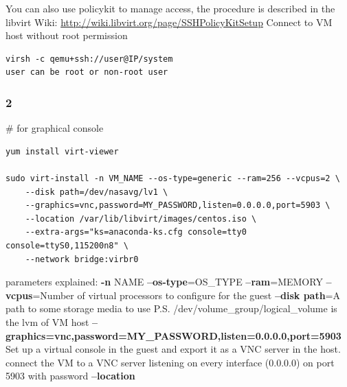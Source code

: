 \documentclass{article}
\begin{document}
You can also use policykit to manage access, the procedure is described in the libvirt Wiki: \url{http://wiki.libvirt.org/page/SSHPolicyKitSetup}
\newline
Connect to VM host without root permission
\begin{verbatim}
virsh -c qemu+ssh://user@IP/system
user can be root or non-root user
\end{verbatim}



    \subsubsection{2}

\# for graphical console\newline

\begin{verbatim}
yum install virt-viewer

sudo virt-install -n VM_NAME --os-type=generic --ram=256 --vcpus=2 \
    --disk path=/dev/nasavg/lv1 \
    --graphics=vnc,password=MY_PASSWORD,listen=0.0.0.0,port=5903 \
    --location /var/lib/libvirt/images/centos.iso \
    --extra-args="ks=anaconda-ks.cfg console=tty0 console=ttyS0,115200n8" \
    --network bridge:virbr0

\end{verbatim}
    \newline
    parameters explained:\newline\newline
    \textbf{-n} NAME \newline
    \textbf{--os-type}=OS\_TYPE\newline
    \textbf{--ram}=MEMORY\newline
    \textbf{--vcpus}=Number of virtual processors to configure for the guest\newline
    \textbf{--disk path}=A path to some storage media to use\newline
    P.S. /dev/volume\_group/logical\_volume is the lvm of VM host\newline
    \textbf{--graphics=vnc,password=MY\_PASSWORD,listen=0.0.0.0,port=5903}\newline
    Set up a virtual console in the guest and export it as a VNC server in the host.\newline
    connect the VM to a VNC server listening on every interface (0.0.0.0) on port 5903 with password \newline
    \textbf{--location}\newline
\end{document}
